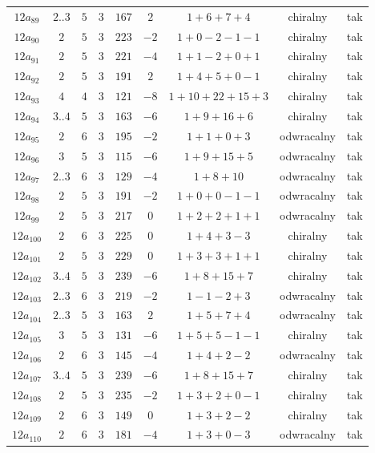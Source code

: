 \begin{longtable}{ccccccccc}
$12a_{89}$ & $2..3$ & $5$ & $3$ & $167$ & $2$ & $1+6+7+4$ & chiralny & tak \\
$12a_{90}$ & $2$ & $5$ & $3$ & $223$ & $-2$ & $1+0-2-1-1$ & chiralny & tak \\
$12a_{91}$ & $2$ & $5$ & $3$ & $221$ & $-4$ & $1+1-2+0+1$ & chiralny & tak \\
$12a_{92}$ & $2$ & $5$ & $3$ & $191$ & $2$ & $1+4+5+0-1$ & chiralny & tak \\
$12a_{93}$ & $4$ & $4$ & $3$ & $121$ & $-8$ & $1+10+22+15+3$ & chiralny & tak \\
$12a_{94}$ & $3..4$ & $5$ & $3$ & $163$ & $-6$ & $1+9+16+6$ & chiralny & tak \\
$12a_{95}$ & $2$ & $6$ & $3$ & $195$ & $-2$ & $1+1+0+3$ & odwracalny & tak \\
$12a_{96}$ & $3$ & $5$ & $3$ & $115$ & $-6$ & $1+9+15+5$ & odwracalny & tak \\
$12a_{97}$ & $2..3$ & $6$ & $3$ & $129$ & $-4$ & $1+8+10$ & odwracalny & tak \\
$12a_{98}$ & $2$ & $5$ & $3$ & $191$ & $-2$ & $1+0+0-1-1$ & odwracalny & tak \\
$12a_{99}$ & $2$ & $5$ & $3$ & $217$ & $0$ & $1+2+2+1+1$ & odwracalny & tak \\
$12a_{100}$ & $2$ & $6$ & $3$ & $225$ & $0$ & $1+4+3-3$ & chiralny & tak \\
$12a_{101}$ & $2$ & $5$ & $3$ & $229$ & $0$ & $1+3+3+1+1$ & chiralny & tak \\
$12a_{102}$ & $3..4$ & $5$ & $3$ & $239$ & $-6$ & $1+8+15+7$ & chiralny & tak \\
$12a_{103}$ & $2..3$ & $6$ & $3$ & $219$ & $-2$ & $1-1-2+3$ & odwracalny & tak \\
$12a_{104}$ & $2..3$ & $5$ & $3$ & $163$ & $2$ & $1+5+7+4$ & odwracalny & tak \\
$12a_{105}$ & $3$ & $5$ & $3$ & $131$ & $-6$ & $1+5+5-1-1$ & chiralny & tak \\
$12a_{106}$ & $2$ & $6$ & $3$ & $145$ & $-4$ & $1+4+2-2$ & odwracalny & tak \\
$12a_{107}$ & $3..4$ & $5$ & $3$ & $239$ & $-6$ & $1+8+15+7$ & chiralny & tak \\
$12a_{108}$ & $2$ & $5$ & $3$ & $235$ & $-2$ & $1+3+2+0-1$ & chiralny & tak \\
$12a_{109}$ & $2$ & $6$ & $3$ & $149$ & $0$ & $1+3+2-2$ & chiralny & tak \\
$12a_{110}$ & $2$ & $6$ & $3$ & $181$ & $-4$ & $1+3+0-3$ & odwracalny & tak \\

\end{longtable}
